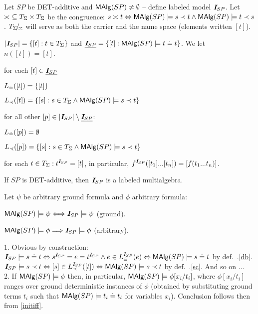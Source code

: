 \documentclass[12pt]{article}
\begin{document}
\begin{Definition}\label{de:init}
Let $SP$ be DET-additive and 
${\sf MAlg}(SP)\not=\emptyset$ -- define labeled model
$\mbox{\bf{\em I}}_{SP}$. Let $\asymp\ \subseteq T_{\Sigma}\times T_{\Sigma}$ be the congruence: 
$s\asymp t\Leftrightarrow {\sf MAlg}(SP)\models s\prec t \land {\sf MAlg}(SP)\models t\prec
s$. $T_{\Sigma}\!{\textstyle /}\!_{\asymp}$ will serve as both the carrier and the name space
(elements written $[t]$). 
\begin{enum}
\item $|\mbox{\bf{\em I}}_{SP}| = \{[t]:t\in T_{\Sigma}\}$ and
$\underline {\mbox{\bf{\em I}}_{SP}}=\{[t]:{\sf MAlg}(SP)\models t\mathrel{\dot{=} } t\}$. We let $n([t]) = [t]$.
\item\label{det} for each $[t]\in\underline {\mbox{\bf{\em I}}_{SP}}$
  \begin{enum}
  \item\label{db} $L_{\mathrel{\dot{=} }}([t]) = \{[t]\}$
  \item\label{dc} $L_{\prec}([t])= \{[s]: s\in T_{\Sigma} \land {\sf MAlg}(SP)\models s\prec t\}$
  \end{enum}
\item\label{set} for all other
$[p]\in|\mbox{\bf{\em I}}_{SP}|\setminus\underline {\mbox{\bf{\em I}}_{SP}}$:
  \begin{enum}
  \item\label{sb} $L_{\mathrel{\dot{=} }}([p]) =\emptyset$
  \item\label{sc} $L_{\prec}([p]) = \{[s]: s\in T_{\Sigma} \land {\sf MAlg}(SP)\models s\prec t\}$
  \end{enum}
\item for each $t\in T_{\Sigma}: t^{{\scriptsize{\mbox{\bf{\em I}}}}_{SP}}=[t]$, in particular,
$f^{{\scriptsize{\mbox{\bf{\em I}}}}_{SP}}([t_1]...[t_n]) = [f(t_1...t_n)]$.
\end{enum}
\end{Definition}
\begin{Claim}
If $SP$ is DET-additive, then $\mbox{\bf{\em I}}_{SP}$ is a labeled multialgebra.
\end{Claim}
\begin{Prop}\label{cl:init} Let $\psi$ be arbitrary ground formula and $\phi$
arbitrary formula:
\begin{enum}
\item\label{initiff}${\sf MAlg}(SP)\models\psi \Longleftrightarrow \mbox{\bf{\em I}}_{SP}\models\psi$ (ground).
\item\label{initng} ${\sf MAlg}(SP)\models\phi \Longrightarrow \mbox{\bf{\em I}}_{SP}\models\phi$ (arbitrary).
\end{enum}
\end{Prop}
\begin{Proof}
1. Obvious by construction: $\mbox{\bf{\em I}}_{SP}\models s\mathrel{\dot{=} } t \Leftrightarrow
s^{{\scriptsize{\mbox{\bf{\em I}}}}_{SP}}= e = t^{{\scriptsize{\mbox{\bf{\em I}}}}_{SP}} \land e\in
L_{\mathrel{\dot{=} }}^{{\scriptsize{\mbox{\bf{\em I}}}}_{SP}}(e) \Leftrightarrow {\sf MAlg}(SP)\models s\mathrel{\dot{=} } t$ by
def.~.\ref{db}.
$\mbox{\bf{\em I}}_{SP}\models s\prec t \Leftrightarrow [s]\in L_{\prec}^{{\scriptsize{\mbox{\bf{\em I}}}}_{SP}}([t]) \Leftrightarrow
{\sf MAlg}(SP)\models s\prec t$ by def.~.\ref{sc}.
And so on ... \\[.5ex]
%
2. If ${\sf MAlg}(SP)\models\phi$ then, in particular, ${\sf MAlg}(SP)\models\phi[x_i/t_i]$, where
   $\phi[x_i/t_i]$ ranges over ground deterministic instances of $\phi$
   (obtained by substituting ground terms $t_i$ such that ${\sf MAlg}(SP)\models
   t_i\mathrel{\dot{=} } t_i$ for variables $x_i$). Conclusion follows then from \ref{initiff}.
\end{Proof}
\end{document}
